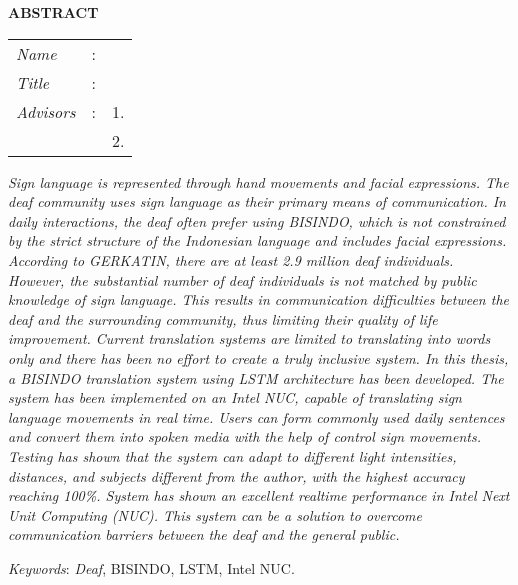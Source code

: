 \begin{center}
  \large\textbf{ABSTRACT}
\end{center}


\vspace{2ex}

\begingroup
\setlength{\tabcolsep}{0pt}

\noindent
\begin{tabularx}{\textwidth}{l >{\centering}m{3em} X}
  \emph{Name}     & : & \name{}         \\

  \emph{Title}    & : & \engtatitle{}   \\

  \emph{Advisors} & : & 1. \advisor{}   \\
                  &   & 2. \coadvisor{} \\
\end{tabularx}
\endgroup

\emph{
  Sign language is represented through hand movements and facial expressions. The deaf community uses sign language as their primary means of communication. In daily interactions, the deaf often prefer using BISINDO, which is not constrained by the strict structure of the Indonesian language and includes facial expressions. According to GERKATIN, there are at least 2.9 million deaf individuals. However, the substantial number of deaf individuals is not matched by public knowledge of sign language. This results in communication difficulties between the deaf and the surrounding community, thus limiting their quality of life improvement. Current translation systems are limited to translating into words only and there has been no effort to create a truly inclusive system. In this thesis, a BISINDO translation system using LSTM architecture has been developed. The system has been implemented on an Intel NUC, capable of translating sign language movements in real time. Users can form commonly used daily sentences and convert them into spoken media with the help of control sign movements. Testing has shown that the system can adapt to different light intensities, distances, and subjects different from the author, with the highest accuracy reaching 100\%. System has shown an excellent realtime performance in Intel Next Unit Computing (NUC). This system can be a solution to overcome communication barriers between the deaf and the general public.}

\emph{Keywords}: \emph{Deaf}, BISINDO, LSTM, Intel NUC.
